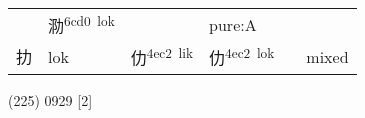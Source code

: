 \documentclass[14pt,a4paper]{scrartcl}
\begin{document}
\begin{longtable}[c]{@{}llllll@{}}
\begin{minipage}[t]{0.14\columnwidth}\raggedright\strut
\strut\end{minipage} &
\begin{minipage}[t]{0.14\columnwidth}\raggedright\strut
泐\textsuperscript{6cd0~lok}
\strut\end{minipage} &
\begin{minipage}[t]{0.14\columnwidth}\raggedright\strut
\strut\end{minipage} &
\begin{minipage}[t]{0.14\columnwidth}\raggedright\strut
pure:A
\strut\end{minipage}\tabularnewline
\begin{minipage}[t]{0.14\columnwidth}\raggedright\strut
扐
\strut\end{minipage} &
\begin{minipage}[t]{0.14\columnwidth}\raggedright\strut
lok
\strut\end{minipage} &
\begin{minipage}[t]{0.14\columnwidth}\raggedright\strut
仂\textsuperscript{4ec2~lik}
\strut\end{minipage} &
\begin{minipage}[t]{0.14\columnwidth}\raggedright\strut
仂\textsuperscript{4ec2~lok}
\strut\end{minipage} &
\begin{minipage}[t]{0.14\columnwidth}\raggedright\strut
\strut\end{minipage} &
\begin{minipage}[t]{0.14\columnwidth}\raggedright\strut
mixed
\strut\end{minipage}\tabularnewline
\bottomrule
\end{longtable}

(225) 0929 {[}2{]}
\end{document}
